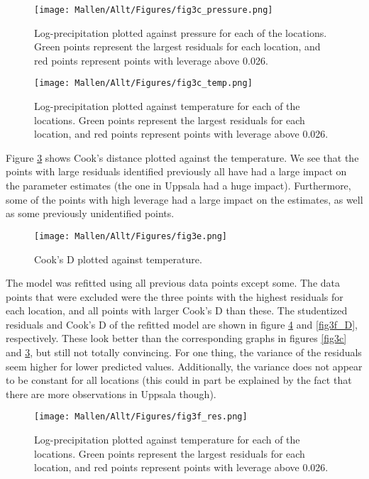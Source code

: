 \begin{figure}[H]
\centering
	\texttt{[image: Mallen/Allt/Figures/fig3c\_pressure.png]}    		\caption{Log-precipitation plotted against pressure for each of the locations. Green points represent the largest residuals for each location, and red points represent points with leverage above 0.026.}
    \label{fig3c_pressure}
\end{figure}

\begin{figure}[H]
\centering
	\texttt{[image: Mallen/Allt/Figures/fig3c\_temp.png]}    		\caption{Log-precipitation plotted against temperature for each of the locations. Green points represent the largest residuals for each location, and red points represent points with leverage above 0.026.}
    \label{fig3c_temp}
\end{figure}

Figure \ref{fig3e} shows Cook's distance plotted against the temperature. We see that the points with large residuals identified previously all have had a large impact on the parameter estimates (the one in Uppsala had a huge impact). Furthermore, some of the points with high leverage had a large impact on the estimates, as well as some previously unidentified points.  
\begin{figure}[H]
\centering
	\texttt{[image: Mallen/Allt/Figures/fig3e.png]}    		\caption{Cook's D plotted against temperature.}
    \label{fig3e}
\end{figure}

The model was refitted using all previous data points except some. The data points that were excluded were the three points with the highest residuals for each location, and all points with larger Cook's D than these. The studentized residuals and Cook's D of the refitted model are shown in figure \ref{fig3f_res} and \ref{fig3f_D}, respectively. These look better than the corresponding graphs in figures \ref{fig3c} and \ref{fig3e}, but still not totally convincing. For one thing, the variance of the residuals seem higher for lower predicted values. Additionally, the variance does not appear to be constant for all locations (this could in part be explained by the fact that there are more observations in Uppsala though).

\begin{figure}[H]
\centering
	\texttt{[image: Mallen/Allt/Figures/fig3f\_res.png]}    		\caption{Log-precipitation plotted against temperature for each of the locations. Green points represent the largest residuals for each location, and red points represent points with leverage above 0.026.}
    \label{fig3f_res}
\end{figure}

